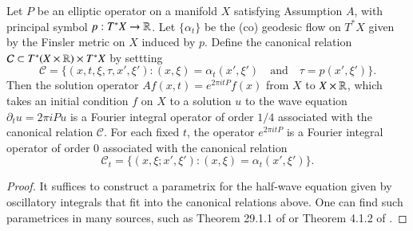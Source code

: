\begin{theorem} \label{waveisanFIOTheorem}
  Let $P$ be an elliptic operator on a manifold $X$ satisfying Assumption $A$, with principal symbol $p: T^* X \to \operatorname{\mathbb{R}}$. Let $\{ \alpha_t \}$ be the (co) geodesic flow on $T^* X$ given by the Finsler metric on $X$ induced by $p$.  Define the canonical relation $\mathcal{C} \subset T^* (X \times \operatorname{\mathbb{R}}) \times T^* X$ by settting
  \[ \mathcal{C} = \{ (x,t,\xi,\tau,x',\xi') : (x,\xi) = \alpha_t(x',\xi') \quad\text{and}\quad \tau = p(x',\xi') \}. \]
  Then the solution operator $Af(x,t) = e^{2 \pi i t P}f(x)$ from $X$ to $X \times \operatorname{\mathbb{R}}$, which takes an initial condition $f$ on $X$ to a solution $u$ to the wave equation $\partial_t u = 2 \pi i P u$ is a Fourier integral operator of order $1/4$ associated with the canonical relation $\mathcal{C}$. For each fixed $t$, the operator $e^{2 \pi i t P}$ is a Fourier integral operator of order $0$ associated with the canonical relation
  \[ \mathcal{C}_t = \{ (x,\xi;x',\xi') : (x,\xi) = \alpha_t(x',\xi') \}. \]
\end{theorem}
\begin{proof}
  It suffices to construct a parametrix for the half-wave equation given by oscillatory integrals that fit into the canonical relations above. One can find such parametrices in many sources, such as Theorem 29.1.1 of \cite{Hormander4} or Theorem 4.1.2 of \cite{Sogge}.
\end{proof}

